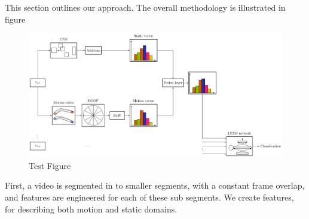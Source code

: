 

This section outlines our approach. The overall methodology is illustrated in figure



\begin{figure}
  \centering
  \includegraphics[scale=0.7]{overall.pdf} 
  \caption{Test Figure}\label{fi:test}
\end{figure}


First, a video is segmented in to smaller segments, with a constant frame overlap, and features are engineered for each of these sub segments. 
We create features, for describing both motion and static domains.

